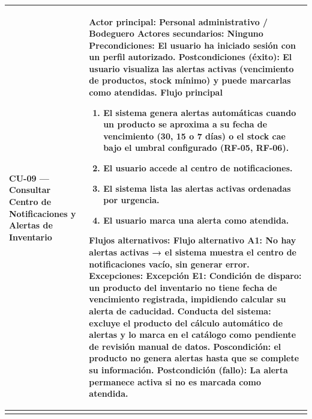 \documentclass[
]{article}
\newcounter{none} %
\begin{document}
{\def\LTcaptype{none} %
\begin{longtable}[]{|
  >{\raggedright\arraybackslash}p{}|
  >{\raggedright\arraybackslash}p{}|}
\hline
\begin{minipage}[b]{\linewidth}\raggedright
\textbf{CU-09 --- Consultar Centro de Notificaciones y Alertas de Inventario}
\end{minipage} & \begin{minipage}[b]{\linewidth}\raggedright
\textbf{Actor principal:} Personal administrativo / Bodeguero
\textbf{Actores secundarios:} Ninguno \textbf{Precondiciones:} El
usuario ha iniciado sesión con un perfil autorizado. \textbf{Postcondiciones (éxito):} El usuario visualiza las alertas
activas (vencimiento de productos, stock mínimo) y puede marcarlas como
atendidas. \textbf{Flujo principal}

\begin{enumerate}
\def\labelenumi{\arabic{enumi}.}
\item
  El sistema genera alertas automáticas cuando un producto se aproxima a
  su fecha de vencimiento (30, 15 o 7 días) o el stock cae bajo el
  umbral configurado (RF-05, RF-06).
\item
  El usuario accede al centro de notificaciones.
\item
  El sistema lista las alertas activas ordenadas por urgencia.
\item
  El usuario marca una alerta como atendida.
\end{enumerate}

\textbf{Flujos alternativos:} Flujo alternativo A1: No hay alertas activas → el sistema muestra el centro de notificaciones vacío, sin generar error.
\textbf{Excepciones:} Excepción E1: Condición de disparo: un producto del inventario no tiene fecha de vencimiento registrada, impidiendo calcular su alerta de caducidad. Conducta del sistema: excluye el producto del cálculo automático de alertas y lo marca en el catálogo como pendiente de revisión manual de datos. Poscondición: el producto no genera alertas hasta que se complete su información.
\textbf{Postcondición (fallo):} La alerta permanece activa si no es marcada como atendida.
\end{minipage} \\
\hline
\endhead
\hline
\endlastfoot
\end{longtable}
}
\end{document}
